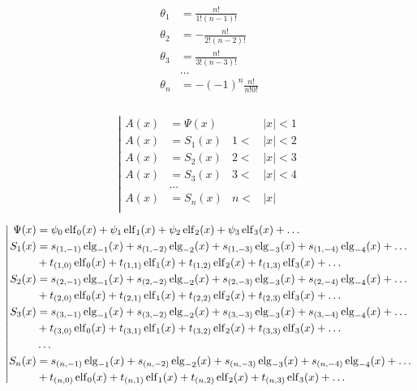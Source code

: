 \begin{equation*} \begin{aligned}
\theta_1 &=
  \displaystyle \frac{n!}{1!(n - 1)!} \\
\theta_2 &=
  - \displaystyle \frac{n!}{2!(n - 2)!} \\
\theta_3 &=
  \displaystyle \frac{n!}{3!(n - 3)!} \\
&\ldots \\
\theta_n &=
  -(-1)^n \displaystyle \frac{n!}{n!0!} \\
  \\
\end{aligned} \end{equation*}

\begin{equation*} \left| \begin{aligned}
A(x) &= \Psi(x) & 
&|x| < 1 \\
%
A(x) &= S_1(x) & 
1 < &|x| < 2 \\
%
A(x) &= S_2(x) & 
2 < &|x| < 3 \\
%
A(x) &= S_3(x) &
3 < &|x| < 4 \\
&\ldots & & \\
%
A(x) &= S_n(x) &
n < &|x| \\
\end{aligned} \right. \end{equation*}

\begin{equation*} \left| \begin{aligned}
\Psi(x) &=
  \psi_0 \elf_0(x)
+ \psi_1 \elf_1(x) 
+ \psi_2 \elf_2(x) 
+ \psi_3 \elf_3(x) 
+ \ldots \\
%
S_1(x) &= 
  s_{(1,-1)} \elg_{-1}(x)
+ s_{(1,-2)} \elg_{-2}(x)
+ s_{(1,-3)} \elg_{-3}(x)
+ s_{(1,-4)} \elg_{-4}(x)
+ \ldots \\ &
+ t_{(1,0)} \elf_0(x)
+ t_{(1,1)} \elf_1(x)
+ t_{(1,2)} \elf_2(x)
+ t_{(1,3)} \elf_3(x)
+ \ldots \\
%
S_2(x) &= 
  s_{(2,-1)} \elg_{-1}(x)
+ s_{(2,-2)} \elg_{-2}(x)
+ s_{(2,-3)} \elg_{-3}(x)
+ s_{(2,-4)} \elg_{-4}(x)
+ \ldots \\ &
+ t_{(2,0)} \elf_0(x)
+ t_{(2,1)} \elf_1(x)
+ t_{(2,2)} \elf_2(x)
+ t_{(2,3)} \elf_3(x)
+ \ldots \\
%
S_3(x) &= 
  s_{(3,-1)} \elg_{-1}(x)
+ s_{(3,-2)} \elg_{-2}(x)
+ s_{(3,-3)} \elg_{-3}(x)
+ s_{(3,-4)} \elg_{-4}(x)
+ \ldots \\ &
+ t_{(3,0)} \elf_0(x)
+ t_{(3,1)} \elf_1(x)
+ t_{(3,2)} \elf_2(x)
+ t_{(3,3)} \elf_3(x)
+ \ldots \\
%
&\ldots \\
%
S_n(x) &= 
  s_{(n,-1)} \elg_{-1}(x)
+ s_{(n,-2)} \elg_{-2}(x)
+ s_{(n,-3)} \elg_{-3}(x)
+ s_{(n,-4)} \elg_{-4}(x)
+ \ldots \\ &
+ t_{(n,0)} \elf_0(x)
+ t_{(n,1)} \elf_1(x)
+ t_{(n,2)} \elf_2(x)
+ t_{(n,3)} \elf_3(x)
+ \ldots \\
\end{aligned} \right. \end{equation*}

